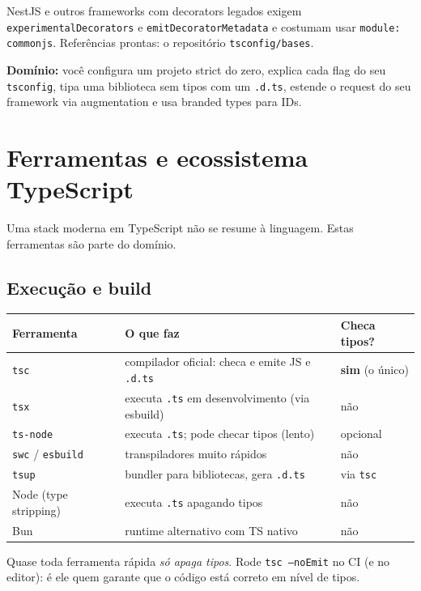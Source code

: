 \documentclass[12pt,a4paper,oneside]{book}
\newcommand{\code}[1]{\texttt{#1}}
\newcommand{\dom}[1]{\begin{dominio}\textbf{Domínio:} #1\end{dominio}}
\begin{document}
NestJS e outros frameworks com decorators legados exigem \code{experimentalDecorators} e \code{emitDecoratorMetadata} e costumam usar \code{module: commonjs}. Referências prontas: o repositório \code{tsconfig/bases}.

\dom{você configura um projeto strict do zero, explica cada flag do seu \code{tsconfig}, tipa uma biblioteca sem tipos com um \code{.d.ts}, estende o request do seu framework via augmentation e usa branded types para IDs.}

\chapter{Ferramentas e ecossistema TypeScript}
\label{cap:ferramentas}

Uma stack moderna em TypeScript não se resume à linguagem. Estas ferramentas são parte do domínio.

\section{Execução e build}

{\small
\begin{tabularx}{\textwidth}{@{}lXX@{}}
\toprule
\textbf{Ferramenta} & \textbf{O que faz} & \textbf{Checa tipos?} \\
\midrule
\code{tsc} & compilador oficial: checa e emite JS e \code{.d.ts} & \textbf{sim} (o único) \\
\code{tsx} & executa \code{.ts} em desenvolvimento (via esbuild) & não \\
\code{ts-node} & executa \code{.ts}; pode checar tipos (lento) & opcional \\
\code{swc} / \code{esbuild} & transpiladores muito rápidos & não \\
\code{tsup} & bundler para bibliotecas, gera \code{.d.ts} & via \code{tsc} \\
Node (type stripping) & executa \code{.ts} apagando tipos & não \\
Bun & runtime alternativo com TS nativo & não \\
\bottomrule
\end{tabularx}
}

\begin{nota}
Quase toda ferramenta rápida \emph{só apaga tipos}. Rode \code{tsc --noEmit} no CI (e no editor): é ele quem garante que o código está correto em nível de tipos.
\end{nota}
\end{document}
